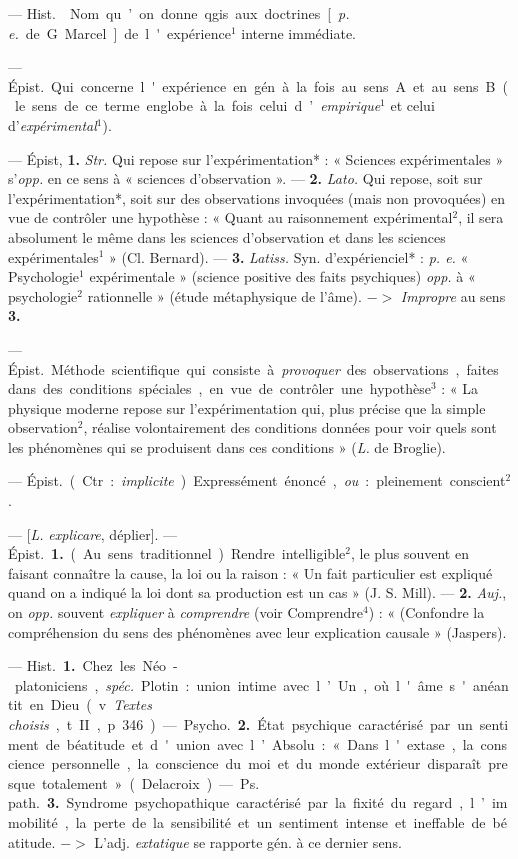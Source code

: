 \begin{itemize}[leftmargin=1cm, label=, itemsep=1pt]
 — \si{Hist.}  Nom
qu’on donne qgis. aux doctrines
[{\it p. e.} de G. Marcel] de l'expérience$^1$
interne immédiate.

 — \si{Épist.}
Qui concerne l'expérience en gén. à
la fois au sens A et au sens B (le sens
de ce terme englobe à la fois celui
d’{\it empirique}$^1$ et celui d'{\it expérimental}$^1$).

 — Épist, {\bf 1.} {\it Str.} Qui
repose sur l’expérimentation* :
« Sciences expérimentales » s’{\it opp.}
en ce sens à « sciences d’observation ». — {\bf 2.} {\it Lato.} Qui repose,
soit sur l’expérimentation*, soit sur des observations invoquées (mais non
provoquées) en vue de contrôler une hypothèse : « Quant au raisonnement
expérimental$^2$, il sera absolument le même dans les sciences
d'observation et dans les sciences expérimentales$^1$ » (Cl. Bernard).
— {\bf 3.} {\it Latiss.} Syn. d'expérienciel* : {\it p. e.}
« Psychologie$^1$ expérimentale »
(science positive des faits psychiques) {\it opp.} à « psychologie$^2$ rationnelle » (étude métaphysique de l'âme).
$->$ {\it Impropre} au sens {\bf 3.}

 — \si{Épist.} Méthode
scientifique qui consiste à {\it provoquer}
des observations, faites dans des conditions spéciales, en vue de contrôler
une hypothèse$^3$ : « La physique
moderne repose sur l'expérimentation qui, plus précise que la
simple observation$^2$, réalise volontairement des conditions données
pour voir quels sont les phénomènes
qui se produisent dans ces conditions » ({\it L.} de Broglie).

 — \si{Épist.} (Ctr. : {\it implicite}).
Expressément énoncé, {\it ou} : pleinement conscient$^2$.

 — [{\it L.} {\it explicare}, déplier]. —
\si{Épist.} {\bf 1.} (Au sens traditionnel).
Rendre intelligible$^2$, le plus souvent
en faisant connaître la cause, la loi
ou la raison : « Un fait particulier est
expliqué quand on a indiqué la loi
dont sa production est un cas »
(J. S. Mill). — {\bf 2.} {\it Auj.}, on {\it opp.} souvent {\it expliquer}
à {\it comprendre} (voir Comprendre$^4$) : « (Confondre la
compréhension du sens des phénomènes avec leur explication causale »
(Jaspers).

 — \si{Hist.} {\bf 1.} Chez les Néo-platoniciens, {\it spéc.}
Plotin : union intime avec l’Un, où l'âme s'anéantit en
Dieu (v. {\it Textes choisis}, t. II, p. 346).
— \si{Psycho.} {\bf 2.} État psychique caractérisé par un sentiment
de béatitude et d'union avec l’Absolu : « Dans
l'extase, la conscience personnelle, la conscience du moi et du monde
extérieur disparaît presque totalement » (Delacroix). — \si{Ps. path.}
{\bf 3.} Syndrome psychopathique caractérisé par la fixité du regard, l’immobilité, la perte de la sensibilité et un sentiment intense et ineffable
de béatitude. $->$ L'adj. {\it extatique} se rapporte gén. à ce dernier sens.


\end{itemize}
